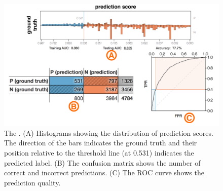 \begin{figure}[t]
\centering
\includegraphics[width=\linewidth]{explainer/overview_final}
\caption[The \tabA.]{
The \textbf{\tabA}.
(A) Histograms showing the distribution of prediction scores.
The direction of the bars indicates the ground truth and their position relative to the threshold line (at 0.531) indicates the predicted label.
(B) The confusion matrix shows the number of correct and incorrect predictions. (C) The ROC curve shows the prediction quality.
}
\label{figs:overview}
\end{figure}

